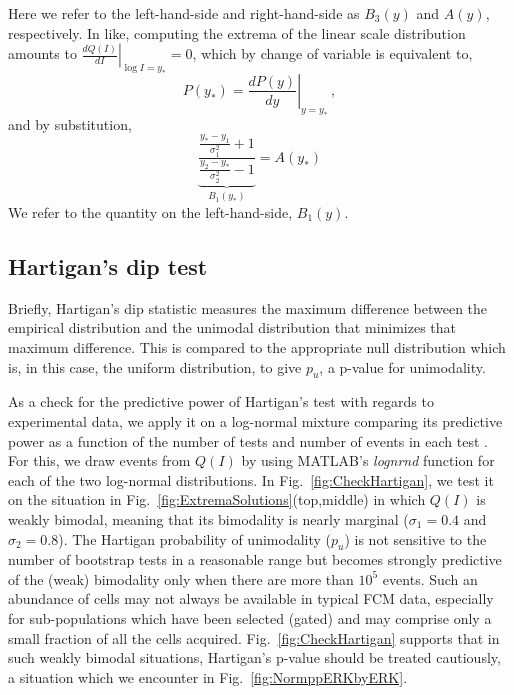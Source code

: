 \documentclass[11pt,a4paper,draft]{article}
\begin{document}
Here we refer to the left-hand-side and right-hand-side as $B_3(y)$ and $A(y)$, respectively. In like, computing the extrema of the linear scale distribution amounts to $\left.\frac{d Q(I)}{dI} \right\vert_{\log I= y_*} = 0$, which by change of variable is equivalent to,
%
\begin{equation}
P(y_*) = \left.\frac{d P(y)}{dy}\right\vert_{y = y_*}\,,
\label{eq:QExtremaStrange}
\end{equation}
%
and by substitution,
%
\begin{equation}
  \underbrace{\frac{\frac{y_*-y_1}{\sigma_1^2}+1}{\frac{y_2-y_*}{\sigma_2^2}-1}}_{B_1(y_*)} = A(y_*) 
  \label{eq:extremaQ}
\end{equation}
%
We refer to the quantity on the left-hand-side, $B_1(y)$.

\subsection*{Hartigan's dip test}
Briefly, Hartigan's dip statistic measures the maximum difference between the empirical distribution and the unimodal distribution that minimizes that maximum difference. This is compared to the appropriate null distribution which is, in this case, the uniform distribution, to give $p_u$, a p-value for unimodality.

As a check for the predictive power of Hartigan's test with regards to experimental data, we apply it on a log-normal mixture comparing its predictive power as a function of the number of tests and number of events in each test \cite{NicPrice}. For this, we draw events from $Q(I)$ by using MATLAB's \emph{lognrnd} function for each of the two log-normal distributions. In Fig.~\ref{fig:CheckHartigan}, we test it on the situation in Fig.~\ref{fig:ExtremaSolutions}(top,middle) in which $Q(I)$ is weakly bimodal, meaning that its bimodality is nearly marginal ($\sigma_1=0.4$ and $\sigma_2=0.8$). The Hartigan probability of unimodality ($p_u$) is not sensitive to the number of bootstrap tests in a reasonable range but becomes strongly predictive of the (weak) bimodality only when there are more than $10^5$ events. Such an abundance of cells may not always be available in typical FCM data, especially for sub-populations which have been selected (gated) and may comprise only a small fraction of all the cells acquired. Fig.~\ref{fig:CheckHartigan} supports that in such weakly bimodal situations, Hartigan's p-value should be treated cautiously, a situation which we encounter in Fig.~\ref{fig:NormppERKbyERK}. \smallskip
\end{document}
